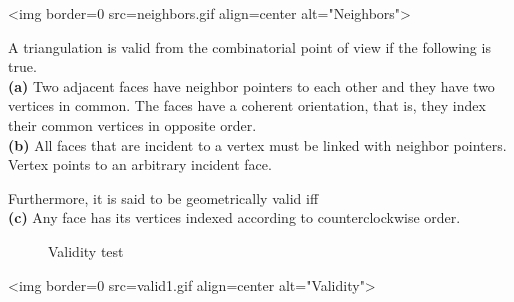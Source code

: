 \begin{ccHtmlOnly}
<img border=0 src=neighbors.gif align=center alt="Neighbors">
\end{ccHtmlOnly} 

\smallskip
A triangulation is valid from the combinatorial point of view if the
following is true.
\\
{\bf (a)} Two adjacent faces have neighbor pointers to each 
other and they have two vertices in common. 
The faces have a
coherent orientation, that is, they index their common  vertices 
in opposite order.
\\
{\bf (b)} All faces that are incident to a vertex  
must be linked with neighbor pointers. Vertex  points to an 
arbitrary incident face. 

Furthermore, it is said to be geometrically valid iff
\\
{\bf (c)} Any face has its vertices indexed according to
counterclockwise order.

\smallskip
\begin{ccTexOnly}
\begin{figure}
\begin{center}  \end{center}
\caption{Validity test}
\label{I1_Fig_valid}
\end{figure}
\end{ccTexOnly} 

\begin{ccHtmlOnly}
<img border=0 src=valid1.gif align=center alt="Validity">
\end{ccHtmlOnly} 


